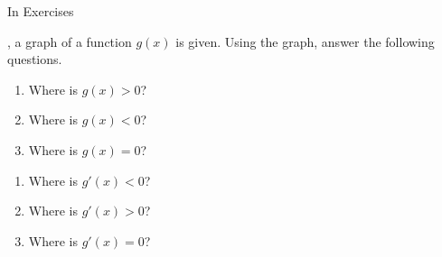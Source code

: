{\noindent In Exercises}
{, a graph of a function $g(x)$ is given. Using the graph, answer the following questions.

\noindent\begin{minipage}[t]{.49\linewidth}
\begin{enumerate}
\item		Where is $g(x) > 0$?
\item		Where is $g(x) < 0$?
\item		Where is $g(x) = 0$?
\end{enumerate}
\end{minipage}
\begin{minipage}[t]{.49\linewidth}
\begin{enumerate}\addtocounter{enumii}{3}
\item		Where is $g'(x) < 0$?
\item		Where is $g'(x) > 0$?
\item		Where is $g'(x) = 0$?
\end{enumerate}
\end{minipage}
}
